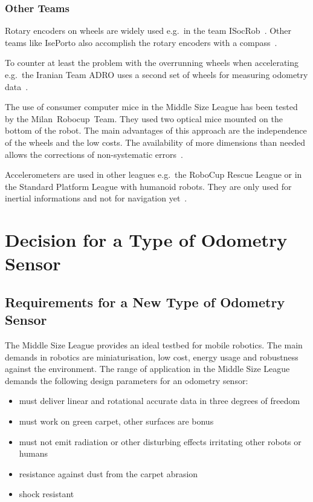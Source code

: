 \documentclass[12pt,a4paper]{article}
\newcommand{\MSL}{Middle Size League\xspace}
\begin{document}
\subsubsection{Other Teams}

Rotary encoders on wheels are widely used e.g.\ in the team ISocRob~\cite{isocrob}.
Other teams like IsePorto also accomplish the rotary encoders with a compass~\cite{iseporto}.

To counter at least the problem with the overrunning wheels when accelerating e.g.\ the Iranian Team ADRO uses a second set of wheels for measuring odometry data~\cite{adro}.

The use of consumer computer mice in the \MSL has been tested by the Milan~Robocup~Team.
They used two optical mice mounted on the bottom of the robot.
The main advantages of this approach are the independence of the wheels and the low costs.
The availability of more dimensions than needed allows the corrections of non-systematic errors~\cite{two_mice}.

Accelerometers are used in other leagues e.g.\ the RoboCup Rescue League or in the Standard Platform League with humanoid robots.
They are only used for inertial informations and not for navigation yet~\cite{zadeat}.

\clearpage
\section{Decision for a Type of Odometry Sensor}
\label{decision}


\subsection{Requirements for a New Type of Odometry Sensor}
\label{requirements}

The \MSL provides an ideal testbed for mobile robotics.
The main demands in robotics are miniaturisation, low cost, energy usage and robustness against the environment.
The range of application in the \MSL demands the following design parameters for an odometry sensor: 
\begin{itemize}
  \item must deliver linear and rotational accurate data in three degrees of freedom
  \item must work on green carpet, other surfaces are bonus
  \item must not emit radiation or other disturbing effects irritating other robots or humans
  \item resistance against dust from the carpet abrasion
  \item shock resistant
\end{itemize}
\end{document}
